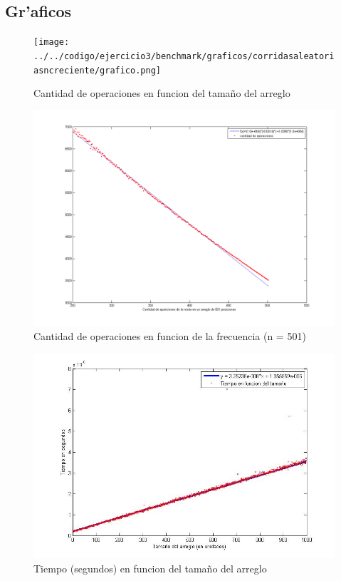\subsection{Gr'aficos}
\begin{figure}[H]
\centering
\texttt{[image: ../../codigo/ejercicio3/benchmark/graficos/corridasaleatoriasncreciente/grafico.png]}
\caption{Cantidad de operaciones en funcion del tama\~{n}o del arreglo}
\end{figure}

\begin{figure}[H]
\centering
\includegraphics[scale=0.5]{../../codigo/ejercicio3/benchmark/graficos/frecuencia/frecuencia.png}
\caption{Cantidad de operaciones en funcion de la frecuencia (n = 501)}
\end{figure}

\begin{figure}[H]
\centering
\includegraphics[scale=0.5]{../../codigo/ejercicio3/benchmark-de-tiempo/graficos/moda-1000-casos.jpg}
\caption{Tiempo (segundos) en funcion del tama\~{n}o del arreglo}
\end{figure}

